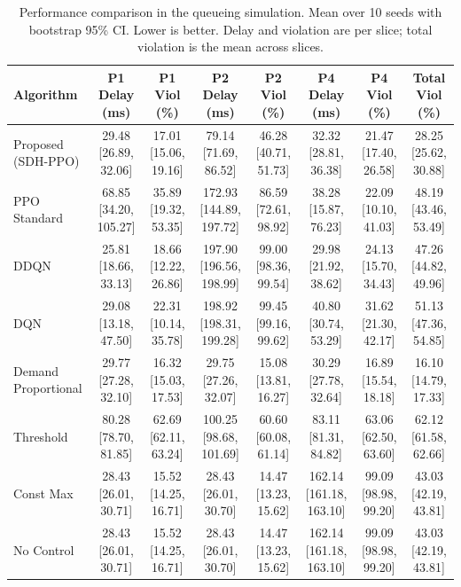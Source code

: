 \begin{table}[t]
\centering
\caption{Performance comparison in the queueing simulation. Mean over 10 seeds with bootstrap 95\% CI. Lower is better. Delay and violation are per slice; total violation is the mean across slices.}
\label{tab:3}
\begin{tabular}{lccccccc}
\toprule
Algorithm & P1 Delay (ms) & P1 Viol (\%) & P2 Delay (ms) & P2 Viol (\%) & P4 Delay (ms) & P4 Viol (\%) & Total Viol (\%) \\
\midrule
Proposed (SDH-PPO) & 29.48 [26.89, 32.06] & 17.01 [15.06, 19.16] & 79.14 [71.69, 86.52] & 46.28 [40.71, 51.73] & 32.32 [28.81, 36.38] & 21.47 [17.40, 26.58] & 28.25 [25.62, 30.88] \\
PPO Standard & 68.85 [34.20, 105.27] & 35.89 [19.32, 53.35] & 172.93 [144.89, 197.72] & 86.59 [72.61, 98.92] & 38.28 [15.87, 76.23] & 22.09 [10.10, 41.03] & 48.19 [43.46, 53.49] \\
DDQN & 25.81 [18.66, 33.13] & 18.66 [12.22, 26.86] & 197.90 [196.56, 198.99] & 99.00 [98.36, 99.54] & 29.98 [21.92, 38.62] & 24.13 [15.70, 34.43] & 47.26 [44.82, 49.96] \\
DQN & 29.08 [13.18, 47.50] & 22.31 [10.14, 35.78] & 198.92 [198.31, 199.28] & 99.45 [99.16, 99.62] & 40.80 [30.74, 53.29] & 31.62 [21.30, 42.17] & 51.13 [47.36, 54.85] \\
Demand Proportional & 29.77 [27.28, 32.10] & 16.32 [15.03, 17.53] & 29.75 [27.26, 32.07] & 15.08 [13.81, 16.27] & 30.29 [27.78, 32.64] & 16.89 [15.54, 18.18] & 16.10 [14.79, 17.33] \\
Threshold & 80.28 [78.70, 81.85] & 62.69 [62.11, 63.24] & 100.25 [98.68, 101.69] & 60.60 [60.08, 61.14] & 83.11 [81.31, 84.82] & 63.06 [62.50, 63.60] & 62.12 [61.58, 62.66] \\
Const Max & 28.43 [26.01, 30.71] & 15.52 [14.25, 16.71] & 28.43 [26.01, 30.70] & 14.47 [13.23, 15.62] & 162.14 [161.18, 163.10] & 99.09 [98.98, 99.20] & 43.03 [42.19, 43.81] \\
No Control & 28.43 [26.01, 30.71] & 15.52 [14.25, 16.71] & 28.43 [26.01, 30.70] & 14.47 [13.23, 15.62] & 162.14 [161.18, 163.10] & 99.09 [98.98, 99.20] & 43.03 [42.19, 43.81] \\
\bottomrule
\end{tabular}
\end{table}